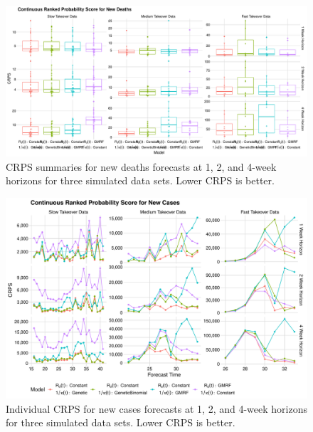 \begin{figure}
    \centering
    \includegraphics[width=1.0\columnwidth]{simulated_crps_comparison_boxplot_data_new_deaths_plot}
    \caption{CRPS summaries for new deaths forecasts at 1, 2, and 4-week horizons for three simulated data sets. Lower CRPS is better.}
    \label{ch_5:fig:simulated_crps_comparison_boxplot_data_new_deaths_plot}
\end{figure}

\begin{figure}
    \centering
    \includegraphics[width=1.0\columnwidth]{simulated_crps_comparison_data_new_cases_plot}
    \caption{Individual CRPS for new cases forecasts at 1, 2, and 4-week horizons for three simulated data sets. Lower CRPS is better.}
    \label{ch_5:fig:simulated_crps_comparison_data_new_cases_plot}
\end{figure}

